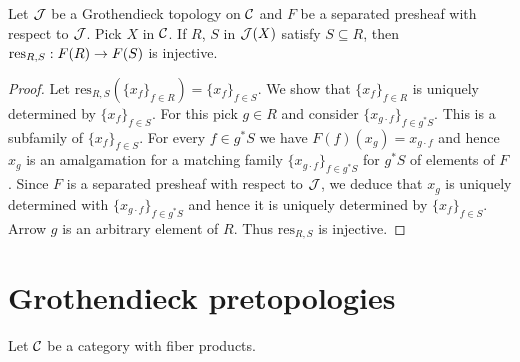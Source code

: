 \begin{proposition}\label{proposition:separatdpresheavesinduceinjections}
Let ${\mathcal J}$ be a Grothendieck topology on ${\mathcal C}$ and $F$ be a separated presheaf with respect to ${\mathcal J}$. Pick $X$ in ${\mathcal C}$. If $R$, $S$ in ${\mathcal J}(X)$ satisfy $S\subseteq R$, then $\mathrm{res}_{R,S}:F(R)\rightarrow F(S)$ is injective.
\end{proposition}
\begin{proof}
Let $\mathrm{res}_{R,S}(\{x_f\}_{f\in R})=\{x_f\}_{f\in S}$. We show that $\{x_f\}_{f\in R}$ is uniquely determined by $\{x_f\}_{f\in S}$. For this pick $g\in R$ and consider $\{x_{g\cdot f}\}_{f\in g^*S}$. This is a subfamily of $\{x_f\}_{f\in S}$. For every $f\in g^*S$ we have $F(f)(x_g)=x_{g\cdot f}$ and hence $x_g$ is an amalgamation for a matching family $\{x_{g\cdot f}\}_{f\in g^*S}$ for $g^*S$ of elements of $F$. Since $F$ is a separated presheaf with respect to ${\mathcal J}$, we deduce that $x_g$ is uniquely determined with $\{x_{g\cdot f}\}_{f\in g^*S}$ and hence it is uniquely determined by $\{x_f\}_{f\in S}$. Arrow $g$ is an arbitrary element of $R$. Thus $\mathrm{res}_{R,S}$ is injective.
\end{proof}

\section{Grothendieck pretopologies}
\noindent
Let ${\mathcal C}$ be a category with fiber products.

